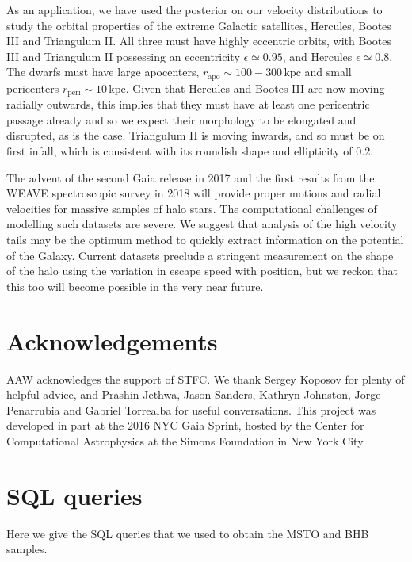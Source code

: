 \documentclass[useAMS,twocolumn,usenatbib]{mn2e}
\def\kpc{{\,\mathrm{kpc}}}
\def\rp{{r_\mathrm{peri}}}
\def\ra{{r_\mathrm{apo}}}
\begin{document}
As an application, we have used the posterior on our velocity distributions to study the orbital properties of the extreme Galactic satellites, Hercules, Bootes III and Triangulum II. 
All three must have highly eccentric orbits, with Bootes III and Triangulum II possessing an eccentricity $\epsilon \simeq 0.95$, and Hercules
$\epsilon \simeq 0.8$. 
The dwarfs must have large apocenters, $\ra \sim 100 - 300\kpc$ and small pericenters $\rp \sim 10\kpc$. 
Given that Hercules and Bootes III are now moving radially outwards, this implies that they must have at least one pericentric passage already and so we expect their morphology to be elongated and disrupted, as is the case. 
Triangulum II is moving inwards, and so must be on first infall, which is consistent with its roundish shape and ellipticity of 0.2.

The advent of the second Gaia release in 2017 and the first results from the WEAVE spectroscopic survey in 2018 will provide proper motions and radial velocities for massive samples of halo stars. 
The computational challenges of modelling such datasets are severe. 
We suggest that analysis of the high velocity tails may be the optimum method to quickly extract information on the potential of the Galaxy.  
Current datasets preclude a stringent measurement on the shape of the halo using the variation in escape speed with position, but we reckon that this too will become possible in the very near future.

\section*{Acknowledgements}

AAW acknowledges the support of STFC. 
We thank Sergey Koposov for plenty of helpful advice, and Prashin Jethwa, Jason Sanders, Kathryn Johnston, Jorge Penarrubia and Gabriel Torrealba for useful conversations. 
This project was developed in part at the 2016 NYC Gaia Sprint, hosted by the Center for Computational Astrophysics at the Simons Foundation in New York City.




\appendix

\section{SQL queries}
\label{sec:sql}

Here we give the {\sc SQL} queries that we used to obtain the MSTO and BHB samples.
\end{document}
